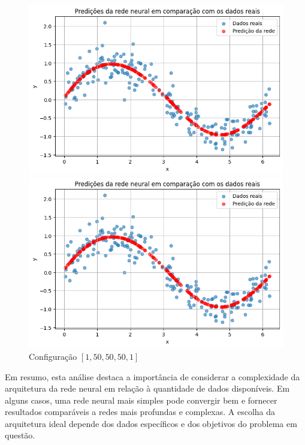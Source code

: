 \begin{figure}[htb]
\begin{minipage}{0.45\textwidth}
		\includegraphics[width=\textwidth]{./0803_imgs/0052_tarefa04/png-241110-190633260-11858406457361919316.png}
	\end{minipage}
	\hfill
	\begin{minipage}{0.45\textwidth}
		\centering
		\caption{Configuração $[1, 50, 50, 50, 
		1]$}\label{fig:tarefa04:50:predicoes}
		\includegraphics[width=\textwidth]{./0803_imgs/0052_tarefa04/png-241110-190650933-14380430249431153222.png}
	\end{minipage}
\end{figure}


Em resumo, esta análise destaca a importância de considerar a complexidade da 
arquitetura da rede neural em relação à quantidade de dados disponíveis. Em 
alguns casos, uma rede neural mais simples pode convergir bem e fornecer 
resultados comparáveis a redes mais profundas e complexas. A escolha da 
arquitetura ideal depende dos dados específicos e dos objetivos do problema em 
questão.

